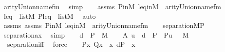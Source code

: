 \begin{isabellebody}
\ arity{\isacharunderscore}{\kern0pt}Union{\isacharunderscore}{\kern0pt}name{\isacharunderscore}{\kern0pt}fm\ \isamarkupfalse%
\ simp\isanewline
\ \ \isamarkupfalse%
\ assms\ P{\isacharunderscore}{\kern0pt}in{\isacharunderscore}{\kern0pt}M\ leq{\isacharunderscore}{\kern0pt}in{\isacharunderscore}{\kern0pt}M\ \ arity{\isacharunderscore}{\kern0pt}Union{\isacharunderscore}{\kern0pt}name{\isacharunderscore}{\kern0pt}fm\isanewline
\ \ \isamarkupfalse%
\ {\isachardoublequoteopen}{\isacharbrackleft}{\kern0pt}{\isasymtau}{\isacharcomma}{\kern0pt}leq{\isacharbrackright}{\kern0pt}\ {\isasymin}\ list{\isacharparenleft}{\kern0pt}M{\isacharparenright}{\kern0pt}{\isachardoublequoteclose}\ {\isachardoublequoteopen}{\isacharbrackleft}{\kern0pt}P{\isacharcomma}{\kern0pt}{\isasymtau}{\isacharcomma}{\kern0pt}leq{\isacharbrackright}{\kern0pt}\ {\isasymin}\ list{\isacharparenleft}{\kern0pt}M{\isacharparenright}{\kern0pt}{\isachardoublequoteclose}\ \isamarkupfalse%
\ auto\isanewline
\ \ \isamarkupfalse%
\ assms\ assms\ P{\isacharunderscore}{\kern0pt}in{\isacharunderscore}{\kern0pt}M\ leq{\isacharunderscore}{\kern0pt}in{\isacharunderscore}{\kern0pt}M\ \ {\isacartoucheopen}arity{\isacharparenleft}{\kern0pt}Union{\isacharunderscore}{\kern0pt}name{\isacharunderscore}{\kern0pt}fm{\isacharparenright}{\kern0pt}{\isasymle}{}{\isacartoucheclose}\isanewline
\ \ \isamarkupfalse%
\ {\isachardoublequoteopen}separation{\isacharparenleft}{\kern0pt}{\isacharhash}{\kern0pt}{\isacharhash}{\kern0pt}M{\isacharcomma}{\kern0pt}{\isacharquery}{\kern0pt}P{\isacharparenright}{\kern0pt}{\isachardoublequoteclose}\isanewline
\ \ \ \ \isamarkupfalse%
\ separation{\isacharunderscore}{\kern0pt}ax\ \isamarkupfalse%
\ simp\isanewline
\ \ \isamarkupfalse%
\ {\isacartoucheopen}{\isacharquery}{\kern0pt}d\ {\isasymtimes}\ P\ {\isasymin}\ M{\isacartoucheclose}\isanewline
\ \ \isamarkupfalse%
\ A{\isacharcolon}{\kern0pt}{\isachardoublequoteopen}{\isacharbraceleft}{\kern0pt}\ u\ {\isasymin}\ {\isacharquery}{\kern0pt}d\ {\isasymtimes}\ P\ {\isachardot}{\kern0pt}\ {\isacharquery}{\kern0pt}P{\isacharparenleft}{\kern0pt}u{\isacharparenright}{\kern0pt}\ {\isacharbraceright}{\kern0pt}\ {\isasymin}\ M{\isachardoublequoteclose}\isanewline
\ \ \ \ \isamarkupfalse%
\ \ separation{\isacharunderscore}{\kern0pt}iff\ \isamarkupfalse%
\ force\isanewline
\ \ \isamarkupfalse%
\ {\isachardoublequoteopen}{\isacharquery}{\kern0pt}P{\isacharparenleft}{\kern0pt}x{\isacharparenright}{\kern0pt}{\isasymlongleftrightarrow}\ {\isacharquery}{\kern0pt}Q{\isacharparenleft}{\kern0pt}x{\isacharparenright}{\kern0pt}{\isachardoublequoteclose}\ \ {\isachardoublequoteopen}x{\isasymin}\ {\isacharquery}{\kern0pt}d{\isasymtimes}P{\isachardoublequoteclose}\ \ x\isanewline

\end{isabellebody}
